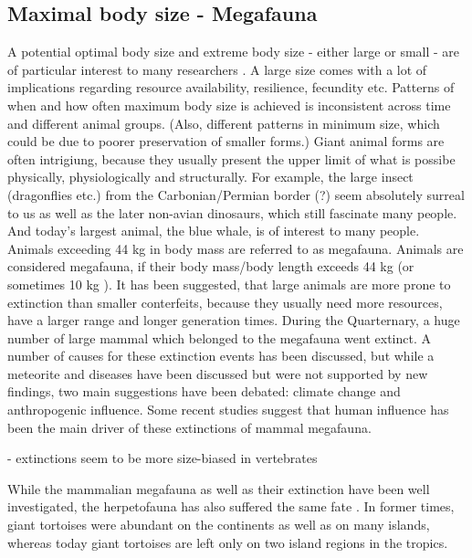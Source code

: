 \subsection{Maximal body size - Megafauna}
A potential optimal body size and extreme body size - either large or small - are of particular interest to many researchers \citep{Smith2009}. A large size comes with a lot of implications regarding resource availability, resilience, fecundity etc. 
Patterns of when and how often maximum body size is achieved is inconsistent across time and different animal groups.
(Also, different patterns in minimum size, which could be due to poorer preservation of smaller forms.)
Giant animal forms are often intrigiung, because they usually present the upper limit of what is possibe physically, physiologically and structurally. 
For example, the large insect (dragonflies etc.) from the Carbonian/Permian border (?) seem absolutely surreal to us as well as the later non-avian dinosaurs, which still fascinate many people. And today's largest animal, the blue whale, is of interest to many people.
Animals exceeding 44 kg in body mass are referred to as megafauna.
Animals are considered megafauna, if their body mass/body length exceeds 44 kg \citep{Barnosky2004} (or sometimes 10 kg \citep{Sandom2014}).
It has been suggested, that large animals are more prone to extinction than smaller conterfeits, because they usually need more resources, have a larger range and longer generation times. During the Quarternary, a huge number of large mammal which belonged to the megafauna went extinct.
A number of causes for these extinction events has been discussed, but while a meteorite and diseases have been discussed but were not supported by new findings, two main suggestions have been debated: climate change and anthropogenic influence. 
Some recent studies \citep{Barnosky2004, Sandom2014, Gibbons2004, Schuster2000} suggest that human influence has been the main driver of these extinctions of mammal megafauna.

- extinctions seem to be more size-biased in vertebrates

While the mammalian megafauna as well as their extinction %
have been well investigated, the herpetofauna has also suffered the same fate \citep{Blain2016}. In former times, giant tortoises were abundant on the continents as well as on many islands, whereas today giant tortoises are left only on two island regions in the tropics.


